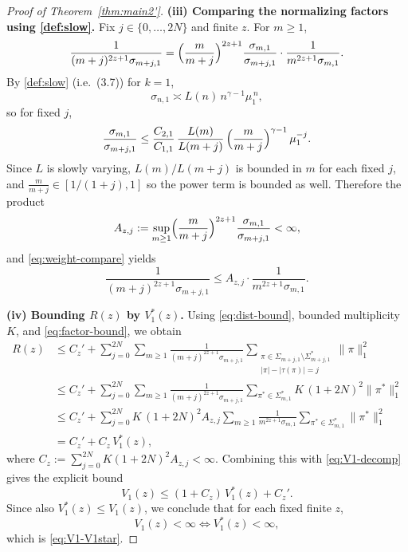 \documentclass[12pt]{amsart}
\theoremstyle{plain}
\numberwithin{equation}{section}
\numberwithin{theorem}{section}
\numberwithin{figure}{section}
\begin{document}
\begin{proof}[Proof of Theorem~\ref{thm:main2'}]
\smallskip\noindent
\textbf{(iii) Comparing the normalizing factors using \eqref{def:slow}.}
Fix $j\in\{0,\dots,2N\}$ and finite $z$. For $m\ge1$,
\begin{equation}\label{eq:weight-compare}
\frac{1}{(m+j)^{2z+1}\sigma_{m+j,1}}
=
\Bigl(\frac{m}{m+j}\Bigr)^{2z+1}\frac{\sigma_{m,1}}{\sigma_{m+j,1}}
\cdot \frac{1}{m^{2z+1}\sigma_{m,1}}.
\end{equation}
By \eqref{def:slow} (i.e.\ (3.7)) for $k=1$,
\[
\sigma_{n,1}\asymp L(n)\,n^{\gamma-1}\mu_1^{\,n},
\]
so for fixed $j$,
\[
\frac{\sigma_{m,1}}{\sigma_{m+j,1}}
\le
\frac{C_{2,1}}{C_{1,1}}\,
\frac{L(m)}{L(m+j)}\,
\Bigl(\frac{m}{m+j}\Bigr)^{\gamma-1}\,
\mu_1^{-j}.
\]
Since $L$ is slowly varying, $L(m)/L(m+j)$ is bounded in $m$ for each fixed $j$,
and $\frac{m}{m+j}\in[1/(1+j),1]$ so the power term is bounded as well. Therefore the product
\[
A_{z,j}:=\sup_{m\ge1}\Bigl(\frac{m}{m+j}\Bigr)^{2z+1}\frac{\sigma_{m,1}}{\sigma_{m+j,1}}<\infty,
\]
and \eqref{eq:weight-compare} yields
\begin{equation}\label{eq:factor-bound}
\frac{1}{(m+j)^{2z+1}\sigma_{m+j,1}}
\le A_{z,j}\cdot \frac{1}{m^{2z+1}\sigma_{m,1}}.
\end{equation}

\smallskip\noindent
\textbf{(iv) Bounding $R(z)$ by $V_1^\ast(z)$.}
Using \eqref{eq:dist-bound}, bounded multiplicity $K$, and \eqref{eq:factor-bound}, we obtain
\begin{align*}
R(z)
&\le C_z' + \sum_{j=0}^{2N}\sum_{m\ge1}
\frac{1}{(m+j)^{2z+1}\sigma_{m+j,1}}
\sum_{\substack{\pi\in\Sigma_{m+j,1}\setminus\Sigma_{m+j,1}^\ast\\ |\pi|-|\tau(\pi)|=j}}
\|\pi\|_1^2 \\
&\le C_z' + \sum_{j=0}^{2N}\sum_{m\ge1}
\frac{1}{(m+j)^{2z+1}\sigma_{m+j,1}}
\sum_{\pi^\ast\in\Sigma_{m,1}^\ast} K\,(1+2N)^2 \|\pi^\ast\|_1^2 \\
&\le C_z' + \sum_{j=0}^{2N} K\,(1+2N)^2 A_{z,j}
\sum_{m\ge1}\frac{1}{m^{2z+1}\sigma_{m,1}}\sum_{\pi^\ast\in\Sigma_{m,1}^\ast}\|\pi^\ast\|_1^2 \\
&= C_z' + C_z\, V_1^\ast(z),
\end{align*}
where $C_z:=\sum_{j=0}^{2N} K(1+2N)^2A_{z,j}<\infty$.
Combining this with \eqref{eq:V1-decomp} gives the explicit bound
\begin{equation}\label{eq:V1-upper-explicit}
V_1(z)\le (1+C_z)\,V_1^\ast(z)+C_z'.
\end{equation}
Since also $V_1^\ast(z)\le V_1(z)$, we conclude that for each fixed finite $z$,
\[
V_1(z)<\infty \iff V_1^\ast(z)<\infty,
\]
which is \eqref{eq:V1-V1star}.






\end{proof}
\end{document}
